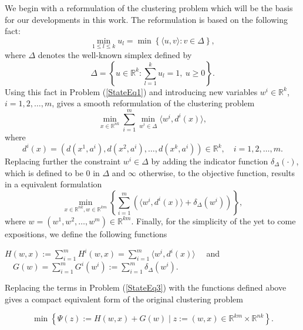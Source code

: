\documentclass[12pt]{article}
\numberwithin{equation}{section}
\begin{document}
We begin with a reformulation of the clustering problem which will be the basis for our developments in this work. The reformulation is based on the following fact:
\begin{equation*}
	\min\limits_{1 \leq l \leq k} u_l = \min \left\lbrace \langle u,v \rangle : v \in \Delta \right\rbrace ,
\end{equation*}
where $\Delta$ denotes the well-known simplex defined by
\begin{equation*}
	\Delta = \left\lbrace u \in \mathbb{R}^k : \sum\limits_{l=1}^{k} u_l = 1, \: u \geq 0 \right\rbrace .
\end{equation*}
Using this fact in Problem (\ref{StateEq1}) and introducing new variables $w^i \in \mathbb{R}^k$, $i=1,2, \ldots, m$, gives a smooth reformulation of the clustering problem
\begin{equation}
	\min\limits_{x \in \mathbb{R}^{nk}} \sum\limits_{i=1}^{m} \min\limits_{w^i \in \Delta} \langle w^i , d^i(x) \rangle , \label{StateEq2}
\end{equation}
where 
\begin{equation*}
d^{i}(x) = (d(x^1,a^i), d(x^2,a^i), \ldots , d(x^k,a^i)) \in \mathbb{R}^k, \quad i=1, 2, \ldots , m.
\end{equation*}
Replacing further the constraint $w^i \in \Delta$ by adding the indicator function $\delta_{\Delta}(\cdot)$, which is defined to be $0$ in $\Delta$ and $\infty$ otherwise, to the objective function, results in a equivalent formulation
\begin{equation}
	\min\limits_{x \in \mathbb{R}^{nk} , w \in \mathbb{R}^{km}} \left\lbrace \sum\limits_{i=1}^{m} \left( \langle w^i , d^i(x) \rangle + \delta_{\Delta}(w^i) \right) \right\rbrace , \label{StateEq3}
\end{equation}
where $w = (w^1, w^2, \ldots , w^m) \in \mathbb{R}^{km}$.
Finally, for the simplicity of the yet to come expositions, we define the following functions
\begin{center}
$H(w,x) := \sum\limits_{i=1}^{m} H^i(w,x) = \sum\limits_{i=1}^{m} \langle w^i , d^i(x) \rangle \quad$ and $\quad G(w) = \sum\limits_{i=1}^{m} G^i(w^i) := \sum\limits_{i=1}^{m} \delta_{\Delta}(w^i) .$
\end{center}

Replacing the terms in Problem (\ref{StateEq3}) with the functions defined above gives a compact equivalent form of the original clustering problem

\begin{equation}
	\min \left\lbrace \Psi(z) := H(w,x) + G(w) \mid z := (w,x) \in \mathbb{R}^{km} \times \mathbb{R}^{nk} \right\rbrace . \label{StateEq4}
\end{equation}
\end{document}

